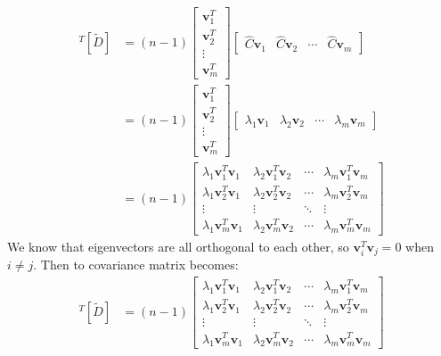 \documentclass[11pt]{article}
\renewcommand{\vec}[1]{\mathbf{#1}}
\begin{document}
\begin{answertext}{22cm}{}
\begin{align*}
[\tilde{D}]^T [\tilde{D}] &= (n-1)
\begin{bmatrix}
\vec{v}_1^T\\
\vec{v}_2^T\\
\vdots\\
\vec{v}_m^T
\end{bmatrix}
\begin{bmatrix}
\hat{C}\vec{v}_1 & \hat{C}\vec{v}_2 & \cdots & \hat{C}\vec{v}_m
\end{bmatrix}\\
&=(n-1)
\begin{bmatrix}
\vec{v}_1^T\\
\vec{v}_2^T\\
\vdots\\
\vec{v}_m^T
\end{bmatrix}
\begin{bmatrix}
\lambda_1\vec{v}_1 & \lambda_2\vec{v}_2 & \cdots & \lambda_m\vec{v}_m
\end{bmatrix}\\
&=(n-1)
\begin{bmatrix}
\lambda_1 \vec{v}_1^T \vec{v}_1 & \lambda_2 \vec{v}_1^T \vec{v}_2 & \cdots & \lambda_m \vec{v}_1^T \vec{v}_m\\
\lambda_1 \vec{v}_2^T \vec{v}_1 & \lambda_2 \vec{v}_2^T \vec{v}_2 & \cdots & \lambda_m \vec{v}_2^T \vec{v}_m\\
\vdots & \vdots & \ddots & \vdots\\
\lambda_1 \vec{v}_m^T \vec{v}_1 & \lambda_2 \vec{v}_m^T \vec{v}_2 & \cdots & \lambda_m \vec{v}_m^T \vec{v}_m
\end{bmatrix}
\end{align*}
We know that eigenvectors are all orthogonal to each other, so $\vec{v}_i^T \vec{v}_j=0$ when $i \neq j$. Then to covariance matrix becomes:
\begin{align*}
[\tilde{D}]^T [\tilde{D}] &=(n-1)
\begin{bmatrix}
\lambda_1 \vec{v}_1^T \vec{v}_1 & \lambda_2 \vec{v}_1^T \vec{v}_2 & \cdots & \lambda_m \vec{v}_1^T \vec{v}_m\\
\lambda_1 \vec{v}_2^T \vec{v}_1 & \lambda_2 \vec{v}_2^T \vec{v}_2 & \cdots & \lambda_m \vec{v}_2^T \vec{v}_m\\
\vdots & \vdots & \ddots & \vdots\\
\lambda_1 \vec{v}_m^T \vec{v}_1 & \lambda_2 \vec{v}_m^T \vec{v}_2 & \cdots & \lambda_m \vec{v}_m^T \vec{v}_m
\end{bmatrix}\\

\end{align*}
\end{answertext}
\end{document}
